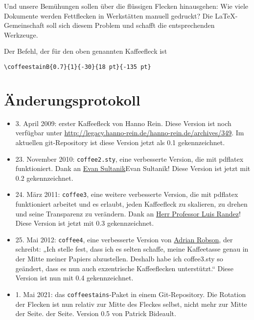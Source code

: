 \documentclass[a4paper, 11pt, BCOR = 0 pt, oneside]{scrartcl}
\begin{document}
Und unsere Bemühungen sollen über die flüssigen Flecken hinausgehen: Wie viele
Dokumente werden Fettflecken in Werkstätten manuell gedruckt? Die
\LaTeX{}-Gemeinschaft soll sich diesem Problem und schafft die entsprechenden
Werkzeuge.

\vfill{}

\begin{tcolorbox}
  Der Befehl, der für den oben genannten Kaffeefleck ist

  \verb|\coffeestainB{0.7}{1}{-30}{18 pt}{-135 pt}|
\end{tcolorbox}
\newpage{}
\section{Änderungsprotokoll}
\begin{itemize}
\item 3. April 2009: erster Kaffeefleck von Hanno Rein. Diese Version ist noch verfügbar unter
 \url{http://legacy.hanno-rein.de/hanno-rein.de/archives/349}. Im aktuellen
git-Repository ist diese Version jetzt als 0.1 gekennzeichnet.
\item 23. November 2010: \texttt{coffee2.sty}, eine verbesserte Version, die mit
  pdflatex funktioniert.  Dank an \href{http://www.sultanik.com/}{Evan
    Sultanik}Evan Sultanik! Diese Version ist jetzt mit 0.2 gekennzeichnet.
\item 24. März 2011: \texttt{coffee3}, eine weitere verbesserte Version, die mit
  pdflatex funktioniert arbeitet und es erlaubt, jeden Kaffeefleck zu skalieren,
  zu drehen und seine Transparenz zu verändern. Dank an
  \href{http://pcmap.unizar.es/~pilar/}{Herr Professor Luis Randez}! Diese
  Version ist jetzt mit 0.3 gekennzeichnet.
\item 25. Mai 2012: \texttt{coffee4}, eine verbesserte Version von
  \href{http://nepsweb.co.uk/homeapr/}{Adrian Robson}, der schreibt: „Ich stelle
  fest, dass ich es selten schaffe, meine Kaffeetasse genau in der Mitte meiner
  Papiers abzustellen. Deshalb habe ich coffee3.sty so geändert, dass es nun
  auch exzentrische Kaffeeflecken unterstützt.“ Diese Version ist nun mit 0.4
  gekennzeichnet.
\item 1. Mai 2021: das \texttt{coffeestains}-Paket in einem Git-Repository. Die Rotation der
Flecken ist nun relativ zur Mitte des Fleckes selbst, nicht mehr zur Mitte der Seite.
der Seite. Version 0.5 von Patrick Bideault.
\end{itemize}
\label{stainC}
\end{document}
